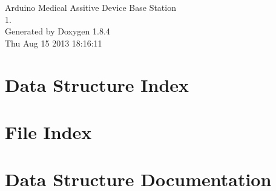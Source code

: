 \documentclass[twoside]{book}
\newcommand{\clearemptydoublepage}{%
  \newpage{\pagestyle{empty}\cleardoublepage}%
}
\begin{document}
\hypersetup{pageanchor=false}
\begin{titlepage}
\vspace*{7cm}
\begin{center}%
{\Large Arduino Medical Assitive Device Base Station \\[1ex]\large 1. }\\
\vspace*{1cm}
{\large Generated by Doxygen 1.8.4}\\
\vspace*{0.5cm}
{\small Thu Aug 15 2013 18:16:11}\\
\end{center}
\end{titlepage}
\clearemptydoublepage
\tableofcontents
\clearemptydoublepage
{}
\hypersetup{pageanchor=true}

\chapter{Data Structure Index}

\chapter{File Index}

\chapter{Data Structure Documentation}






























\end{document}
